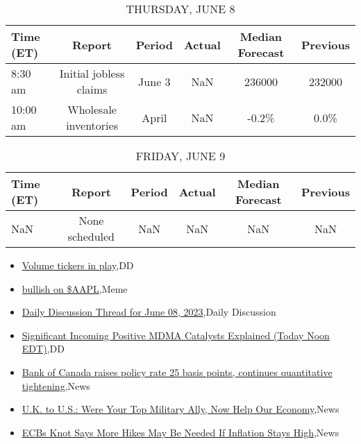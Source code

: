 \documentclass{article}%
\begin{document}
%


\begin{table}[htbp]%
\caption{THURSDAY, JUNE 8}%
\centering%
\begin{adjustbox}{width=1\textwidth}%
\begin{tabular}{lccccc}
\toprule
Time (ET) &                 Report & Period & Actual & Median Forecast & Previous \\
\midrule
  8:30 am & Initial jobless claims & June 3 &    NaN &          236000 &   232000 \\
 10:00 am &  Wholesale inventories &  April &    NaN &           -0.2\% &     0.0\% \\
\bottomrule
\end{tabular}
%
\end{adjustbox}%
\end{table}

%


\begin{table}[htbp]%
\caption{FRIDAY, JUNE 9}%
\centering%
\begin{adjustbox}{width=1\textwidth}%
\begin{tabular}{lccccc}
\toprule
Time (ET) &         Report & Period & Actual & Median Forecast & Previous \\
\midrule
      NaN & None scheduled &    NaN &    NaN &             NaN &      NaN \\
\bottomrule
\end{tabular}
%
\end{adjustbox}%
\end{table}

%
\begin{itemize}%
\item%
\href{https://reddit.com/r/wallstreetbets/comments/1447eic/volume\_tickers\_in\_play/}{Volume tickers in play},DD%
\item%
\href{https://reddit.com/r/wallstreetbets/comments/1446kwt/bullish\_on\_aapl/}{bullish on \$AAPL},Meme%
\item%
\href{https://reddit.com/r/wallstreetbets/comments/1444zoo/daily\_discussion\_thread\_for\_june\_08\_2023/}{Daily Discussion Thread for June 08, 2023},Daily Discussion%
\item%
\href{https://reddit.com/r/Baystreetbets/comments/1448aac/significant\_incoming\_positive\_mdma\_catalysts/}{Significant Incoming Positive MDMA Catalysts Explained (Today Noon EDT)},DD%
\item%
\href{https://reddit.com/r/Economics/comments/143jhse/bank\_of\_canada\_raises\_policy\_rate\_25\_basis\_points/}{Bank of Canada raises policy rate 25 basis points, continues quantitative tightening},News%
\item%
\href{https://reddit.com/r/Economics/comments/143a4fu/uk\_to\_us\_were\_your\_top\_military\_ally\_now\_help\_our/}{U.K. to U.S.: Were Your Top Military Ally, Now Help Our Economy},News%
\item%
\href{https://reddit.com/r/Economics/comments/1439ser/ecbs\_knot\_says\_more\_hikes\_may\_be\_needed\_if/}{ECBs Knot Says More Hikes May Be Needed If Inflation Stays High},News%
\end{itemize}%
\end{document}
